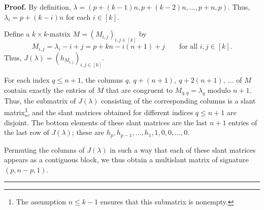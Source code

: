 \documentclass[numbers=enddot,12pt,final,onecolumn,notitlepage]{scrartcl}%
\theoremstyle{definition}
\newenvironment{proof}[1][Proof]{\noindent\textbf{#1.} }{\ \rule{0.5em}{0.5em}}
\newcommand{\tup}[1]{\left( #1 \right)}
\renewcommand{\leq}{\leqslant}
\theoremstyle{plainsl}
\begin{document}
\begin{proof}
By definition,
$\lambda = (p+(k-1)n, p+(k-2)n, \ldots, p+n, p)$.
Thus, $\lambda_i = p + (k-i)n$ for each $i \in [k]$.

Define a $k\times k$-matrix $M = \tup{M_{i,j}}_{i,j\in[k]}$
by
\[
M_{i,j} = \lambda_{i}-i+j
= p + kn - i\tup{n+1} + j
\qquad \text{for all $i,j\in[k]$.}
\]
Thus, $J(\lambda) = \left( h_{M_{i,j}} \right)_{i,j \in [k]}$.

For each index $q \leq n+1$,
the columns $q,\ q+(n+1),\ q+2(n+1),\ \ldots$ of $M$
contain exactly the entries of $M$ that are congruent to $M_{q,q} = \lambda_q$ modulo $n+1$.
Thus, the submatrix of $J(\lambda)$ consisting of
the corresponding columns is a slant matrix\footnote{The
assumption $n \leq k-1$ ensures that this submatrix
is nonempty.}, and the slant matrices obtained for different
indices $q \leq n+1$ are disjoint.
The bottom elements of these slant matrices are the last $n+1$
entries of the last row of $J(\lambda)$; these are
$h_p, h_{p-1}, \ldots, h_1, 1, 0, 0, \ldots, 0$.

Permuting the columns of $J(\lambda)$ in such a way that
each of these slant matrices appears as a contiguous block,
we thus obtain a multislant matrix of signature
$(p, n-p, 1)$.
%
%
%
%
%
\end{proof}
\end{document}
